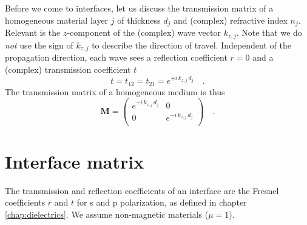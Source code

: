 Before we come to interfaces, let us discuss the transmission matrix of a homogeneous material layer $j$ of thickness $d_j$ and (complex) refractive index $n_j$. Relevant is the $z$-component of the (complex) wave vector $k_{z,j}$. Note that we do \emph{not} use the sign of  $k_{z,j}$ to describe the direction of travel.
Independent of the propagation direction, each wave sees a reflection coefficient $r=0$ and a (complex) transmission coefficient $t$
\begin{equation}
t = t_{12} = t_{21} = e^{+ i \, k_{z,j} \, d_j } \quad . 
\end{equation}
The transmission matrix of a homogeneous medium is thus
\begin{equation}
\mathbf{M} = 
\begin{pmatrix}
e^{+i \, k_{z,j} \, d_j } & 0 \\0 & e^{-i \, k_{z,j} \, d_j } \\
\end{pmatrix} \quad . 
\label{eq:6_M_prob}
\end{equation}


\section{Interface matrix}

The transmission and reflection coefficients of an interface are the Fresnel coefficients $r$ and $t$ for s and p polarization, as defined in chapter \ref{chap:dielectrics}. We assume non-magnetic materials ($\mu = 1$).



